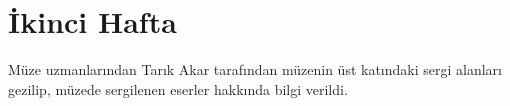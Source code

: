 \section{İkinci Hafta}
\indent\indent Müze uzmanlarından Tarık Akar tarafından müzenin üst katındaki sergi alanları gezilip, müzede sergilenen eserler hakkında bilgi verildi.\newpage

